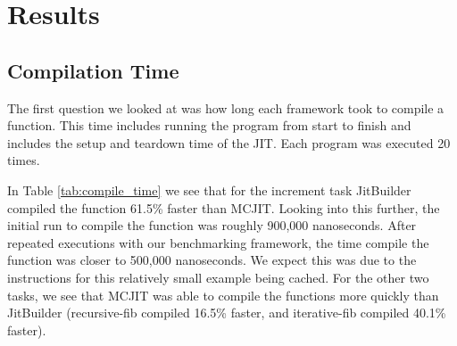 \section{Results}
\label{sec:results}
\subsection{Compilation Time}
The first question we looked at was how long each framework took to compile a function. 
This time includes running the program from start to finish and includes the setup and teardown time of the JIT.
Each program was executed 20 times.

In Table \ref{tab:compile_time} we see that for the increment task JitBuilder compiled the function 61.5\% faster than MCJIT.
Looking into this further, the initial run to compile the function was roughly 900,000 nanoseconds.
After repeated executions with our benchmarking framework\cite{googleBench}, the time compile the function was closer to 500,000 nanoseconds. 
We expect this was due to the instructions for this relatively small example being cached.
For the other two tasks, we see that MCJIT was able to compile the functions more quickly than JitBuilder (recursive-fib compiled 16.5\% faster, and iterative-fib compiled 40.1\% faster).



